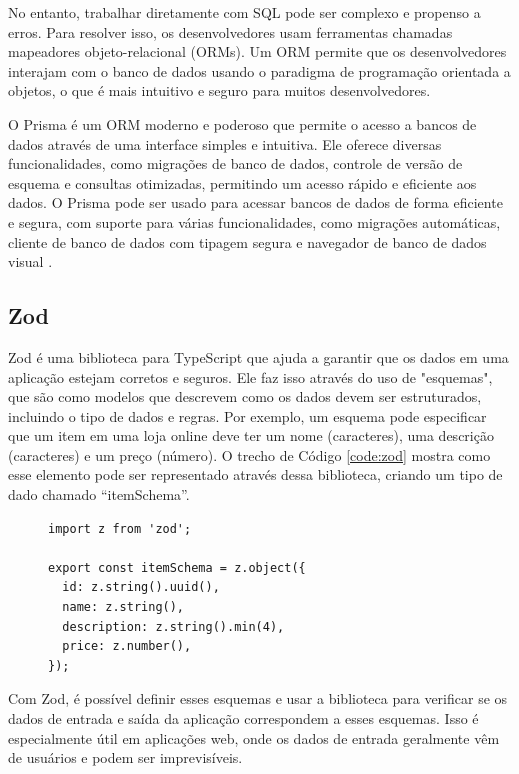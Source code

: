 No entanto, trabalhar diretamente com SQL pode ser complexo e propenso a erros. Para resolver isso, os desenvolvedores usam ferramentas chamadas mapeadores objeto-relacional (ORMs). Um ORM permite que os desenvolvedores interajam com o banco de dados usando o paradigma de programação orientada a objetos, o que é mais intuitivo e seguro para muitos desenvolvedores.

O Prisma é um ORM moderno e poderoso que permite o acesso a bancos de dados através de uma interface simples e intuitiva. Ele oferece diversas funcionalidades, como migrações de banco de dados, controle de versão de esquema e consultas otimizadas, permitindo um acesso rápido e eficiente aos dados. O Prisma pode ser usado para acessar bancos de dados de forma eficiente e segura, com suporte para várias funcionalidades, como migrações automáticas, cliente de banco de dados com tipagem segura e navegador de banco de dados visual \cite{Prisma2023}.

\subsection{Zod}

Zod é uma biblioteca para TypeScript que ajuda a garantir que os dados em uma aplicação estejam corretos e seguros. Ele faz isso através do uso de "esquemas", que são como modelos que descrevem como os dados devem ser estruturados, incluindo o tipo de dados e regras. Por exemplo, um esquema pode especificar que um item em uma loja online deve ter um nome (caracteres), uma descrição (caracteres) e um preço (número). O trecho de Código \ref{code:zod} mostra como esse elemento pode ser representado através dessa biblioteca, criando um tipo de dado chamado ``itemSchema''.

\renewcommand{\lstlistingname}{Código Fonte}

\begin{figure}[h]
\begin{lstlisting}[caption={Exemplo de uso da biblioteca Zod.},label={code:zod}]
import z from 'zod';

export const itemSchema = z.object({
  id: z.string().uuid(),
  name: z.string(),
  description: z.string().min(4),
  price: z.number(),
});
\end{lstlisting}
\end{figure}

Com Zod, é possível definir esses esquemas e usar a biblioteca para verificar se os dados de entrada e saída da aplicação correspondem a esses esquemas. Isso é especialmente útil em aplicações web, onde os dados de entrada geralmente vêm de usuários e podem ser imprevisíveis.

